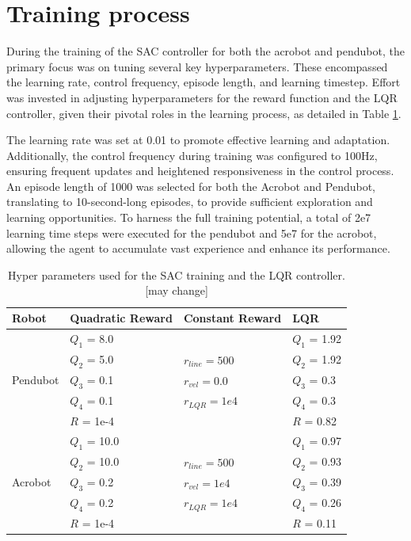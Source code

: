 \section{Training process}
During the training of the SAC controller for both the acrobot and pendubot, the primary focus was on tuning several key hyperparameters. These encompassed the learning rate, control frequency, episode length, and learning timestep. Effort was invested in adjusting hyperparameters for the reward function and the LQR controller, given their pivotal roles in the learning process, as detailed in Table \ref{tab:training_parameters}.

The learning rate was set at 0.01 to promote effective learning and adaptation. Additionally, the control frequency during training was configured to 100Hz, ensuring frequent updates and heightened responsiveness in the control process. An episode length of 1000 was selected for both the Acrobot and Pendubot, translating to 10-second-long episodes, to provide sufficient exploration and learning opportunities. To harness the full training potential, a total of 2e7 learning time steps were executed for the pendubot and 5e7 for the acrobot, allowing the agent to accumulate vast experience and enhance its performance.

\begin{table}[H]
  \centering
  \begin{tabular}{p{2cm} | p{3cm} | p{3cm} | p{3cm}}
  Robot & Quadratic Reward  & Constant Reward & LQR\\
  \hline
  \multirow{5}{*}{Pendubot} & \(Q_1\) = 8.0  &  & \(Q_1\) = 1.92\\
  & \(Q_2\) = 5.0  & \(r_{line}=500\) & \(Q_2\) = 1.92\\
  & \(Q_3\) = 0.1  & \(r_{vel}=0.0\) & \(Q_3\) = 0.3\\
  & \(Q_4\) = 0.1  & \(r_{LQR}=1e4\)& \(Q_4\) = 0.3\\
  & \(R\) = 1e-4  & & \(R\) = 0.82\\
  \hline
  \multirow{5}{*}{Acrobot} & \(Q_1\) = 10.0  &  & \(Q_1\) = 0.97\\
  & \(Q_2\) = 10.0  & \(r_{line}=500\) & \(Q_2\) = 0.93\\
  & \(Q_3\) = 0.2  & \(r_{vel}=1e4\) & \(Q_3\) = 0.39\\
  & \(Q_4\) = 0.2  & \(r_{LQR}=1e4\) & \(Q_4\) = 0.26\\
  & \(R\) = 1e-4  &  & \(R\) = 0.11\\
  \end{tabular}
 \caption{Hyper parameters used for the SAC training and the LQR controller.[may change]}
 \label{tab:training_parameters}
\end{table}

